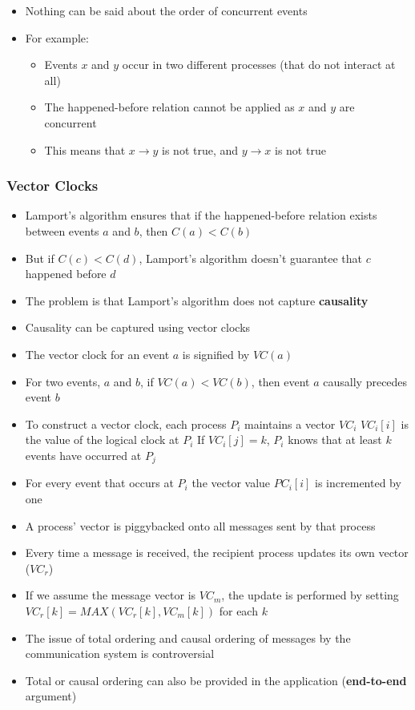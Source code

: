 \begin{itemize}
	\item Nothing can be said about the order of concurrent events
	\item For example:
	\begin{itemize}
		\item Events $x$ and $y$ occur in two different processes (that do not interact at all)
		\item The happened-before relation cannot be applied as $x$ and $y$ are concurrent
		\item This means that $x\rightarrow y$ is not true, and $y\rightarrow x$ is not true
	\end{itemize}
\end{itemize}

\subsubsection{Vector Clocks}
\begin{itemize}
	\item Lamport's algorithm ensures that if the happened-before relation exists between events $a$ and $b$, then $C(a) < C(b)$
	\item But if $C(c) < C(d)$, Lamport's algorithm doesn't guarantee that $c$ happened before $d$
	\item The problem is that Lamport's algorithm does not capture \textbf{causality}
	\item Causality can be captured using vector clocks
	\item The vector clock for an event $a$ is signified by $VC(a)$
	\item For two events, $a$ and $b$, if $VC(a) < VC(b)$, then event $a$ causally precedes event $b$
	\item To construct a vector clock, each process $P_i$ maintains a vector $VC_i$
	\subitem $VC_i[i]$ is the value of the logical clock at $P_i$
	\subitem If $VC_i[j] = k$, $P_i$ knows that at least $k$ events have occurred at $P_j$
	\item For every event that occurs at $P_i$ the vector value $PC_i[i]$ is incremented by one
	\item A process' vector is piggybacked onto all messages sent by that process
	\item Every time a message is received, the recipient process updates its own vector ($VC_r$)
	\item If we assume the message vector is $VC_m$, the update is performed by setting $VC_r[k] = MAX(VC_r[k], VC_m[k])$ for each $k$
	\item The issue of total ordering and causal ordering of messages by the communication system is controversial
	\item Total or causal ordering can also be provided in the application (\textbf{end-to-end} argument)	
\end{itemize}

